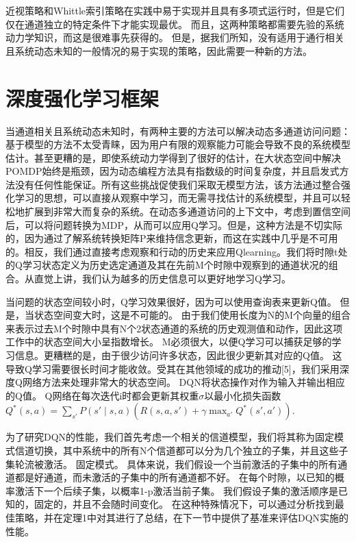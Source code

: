 近视策略和Whittle索引策略在实践中易于实现并且具有多项式运行时，但是它们仅在通道独立的特定条件下才能实现最优。 而且，这两种策略都需要先验的系统动力学知识，而这是很难事先获得的。 但是，据我们所知，没有适用于通行相关且系统动态未知的一般情况的易于实现的策略，因此需要一种新的方法。

\section*{  深度强化学习框架    }
当通道相关且系统动态未知时，有两种主要的方法可以解决动态多通道访问问题：基于模型的方法不太受青睐，因为用户有限的观察能力可能会导致不良的系统模型估计。甚至更糟的是，即使系统动力学得到了很好的估计，在大状态空间中解决POMDP始终是瓶颈，因为动态编程方法具有指数级的时间复杂度，并且启发式方法没有任何性能保证。所有这些挑战促使我们采取无模型方法，该方法通过整合强化学习的思想，可以直接从观察中学习，而无需寻找估计的系统模型，并且可以轻松地扩展到非常大而复杂的系统。在动态多通道访问的上下文中，考虑到置信空间后，可以将问题转换为MDP，从而可以应用Q学习。但是，这种方法是不切实际的，因为通过了解系统转换矩阵P来维持信念更新，而这在实践中几乎是不可用的。相反，我们通过直接考虑观察和行动的历史来应用Qlearning。我们将时隙t处的Q学习状态定义为历史选定通道及其在先前M个时隙中观察到的通道状况的组合。从直觉上讲，我们认为越多的历史信息可以更好地学习Q学习。

当问题的状态空间较小时，Q学习效果很好，因为可以使用查询表来更新Q值。 但是，当状态空间变大时，这是不可能的。 由于我们使用长度为N的M个向量的组合来表示过去M个时隙中具有N个2状态通道的系统的历史观测值和动作，因此这项工作中的状态空间大小呈指数增长。 M必须很大，以便Q学习可以捕获足够的学习信息。更糟糕的是，由于很少访问许多状态，因此很少更新其对应的Q值。 这导致Q学习需要很长时间才能收敛。受其在其他领域的成功的推动[5]，我们采用深度Q网络方法来处理非常大的状态空间。 DQN将状态操作对作为输入并输出相应的Q值。 Q网络在每次迭代i时都会更新其权重$\sigma$以最小化损失函数$Q^{*}\left ( s,a \right )=\sum _{{s}'}P\left ( {s}'\mid s,a \right )\left ( R\left ( s,a,{s}' \right ) +\gamma\max _{{a}'}Q^{*}\left ( {s}' ,{a}'\right )\right )$.

为了研究DQN的性能，我们首先考虑一个相关的信道模型，我们将其称为固定模式信道切换，其中系统中的所有N个信道都可以分为几个独立的子集，并且这些子集轮流被激活。 固定模式。 具体来说，我们假设一个当前激活的子集中的所有通道都是好通道，而未激活的子集中的所有通道都不好。 在每个时隙，以已知的概率激活下一个后续子集，以概率1-p激活当前子集。 我们假设子集的激活顺序是已知的，固定的，并且不会随时间变化。 在这种特殊情况下，可以通过分析找到最佳策略，并在定理1中对其进行了总结，在下一节中提供了基准来评估DQN实施的性能。

